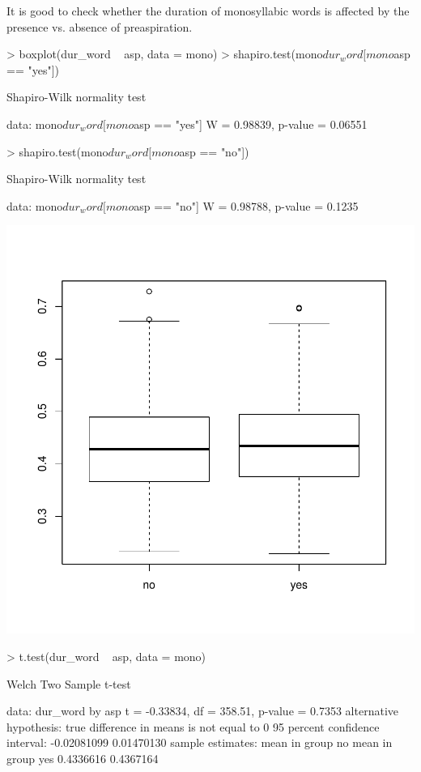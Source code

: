 \documentclass[a4paper,11pt]{article}
\begin{document}
It is good to check whether the duration of monosyllabic words is affected by the presence vs. absence of preaspiration.

\begin{Schunk}
\begin{Sinput}
> boxplot(dur_word ~ asp, data = mono)
> shapiro.test(mono$dur_word[mono$asp == "yes"])
\end{Sinput}
\begin{Soutput}
	Shapiro-Wilk normality test

data:  mono$dur_word[mono$asp == "yes"]
W = 0.98839, p-value = 0.06551
\end{Soutput}
\begin{Sinput}
> shapiro.test(mono$dur_word[mono$asp == "no"])
\end{Sinput}
\begin{Soutput}
	Shapiro-Wilk normality test

data:  mono$dur_word[mono$asp == "no"]
W = 0.98788, p-value = 0.1235
\end{Soutput}
\end{Schunk}
\includegraphics{analysis-018}

\begin{Schunk}
\begin{Sinput}
> t.test(dur_word ~ asp, data = mono)
\end{Sinput}
\begin{Soutput}
	Welch Two Sample t-test

data:  dur_word by asp
t = -0.33834, df = 358.51, p-value = 0.7353
alternative hypothesis: true difference in means is not equal to 0
95 percent confidence interval:
 -0.02081099  0.01470130
sample estimates:
 mean in group no mean in group yes 
        0.4336616         0.4367164 
\end{Soutput}
\end{Schunk}
\end{document}
